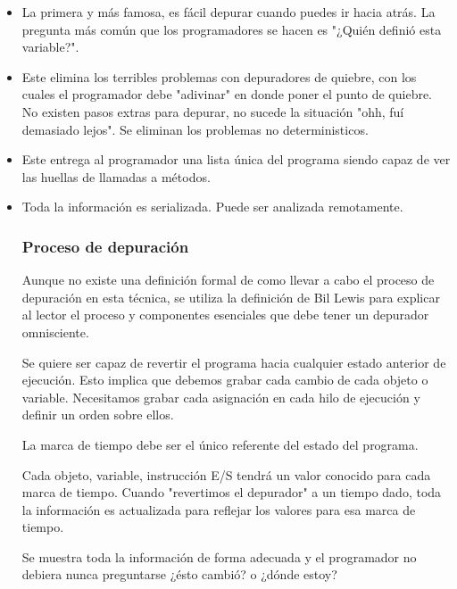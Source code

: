 \documentclass[12pt,a4paper]{report}
\begin{document}
\begin{itemize}
	\item La primera y más famosa, es fácil depurar cuando puedes ir hacia atrás.  La pregunta más común que los programadores se hacen es "¿Quién definió esta variable?".

	\item Este elimina los terribles problemas con depuradores de quiebre, con los cuales el programador debe "adivinar" en donde poner el punto de quiebre.  No existen pasos extras para depurar, no sucede la situación "ohh, fuí demasiado lejos".  Se eliminan los problemas no deterministicos.

	\item Este entrega al programador una lista única del programa siendo capaz de ver las huellas de llamadas a métodos.

	\item Toda la información es serializada.  Puede ser analizada remotamente.

			\subsubsection{Proceso de depuración}

Aunque no existe una definición formal de como llevar a cabo el proceso de depuración en esta técnica, se utiliza la definición de Bil Lewis para explicar al lector el proceso y componentes esenciales que debe tener un depurador omnisciente.


Se quiere ser capaz de revertir el programa hacia cualquier estado anterior de ejecución.  Esto implica que debemos grabar cada cambio de cada objeto o variable.  Necesitamos grabar cada asignación en cada hilo de ejecución y definir un orden sobre ellos.

La marca de tiempo debe ser el único referente del estado del programa.


Cada objeto, variable, instrucción E/S tendrá un valor conocido para cada marca de tiempo.  Cuando "revertimos el depurador" a un tiempo dado, toda la información es actualizada para reflejar los valores para esa marca de tiempo.

Se muestra toda la información de forma adecuada y el programador no debiera nunca preguntarse ¿ésto cambió? o ¿dónde estoy?



\end{itemize}
\end{document}
